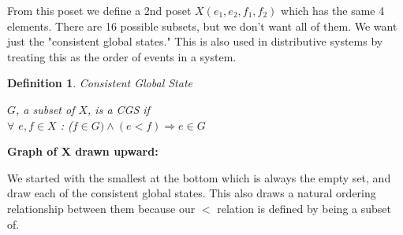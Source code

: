 \documentclass[twoside]{article}
\newtheorem{definition}[theorem]{Definition}
\begin{document}
From this poset we define a 2nd poset $X (e_1, e_2, f_1, f_2)$ which has the same 4 elements. There are 16 possible subsets, but we don't want all of them. We want just the "consistent global states." This is also used in distributive systems by treating this as the order of events in a system.

\begin{definition}
Consistent Global State

$G$, a subset of $X$, is a CGS if\\
$\forall$ $e, f \in X$ : ($f \in G) \land (e < f) \Rightarrow e \in G$

\end{definition}

\textbf{Graph of X drawn upward:}


We started with the smallest at the bottom which is always the empty set, and draw each of the consistent global states. This also draws a natural ordering relationship between them because our $<$ relation is defined by being a subset of.
\end{document}
